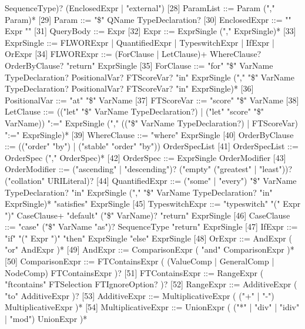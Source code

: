                           SequenceType)? (EnclosedExpr | "external")
[28]   	ParamList ::= Param ("," Param)*
[29]   	Param ::= "\$" QName TypeDeclaration?
[30]   	EnclosedExpr ::= "{" Expr "}"
[31]   	QueryBody ::= Expr
[32]   	Expr ::= ExprSingle ("," ExprSingle)*
[33]   	ExprSingle ::= FLWORExpr
                       | QuantifiedExpr
                       | TypeswitchExpr
                       | IfExpr
                       | OrExpr
[34]   	FLWORExpr ::= (ForClause | LetClause)+ WhereClause? OrderByClause?
                      "return" ExprSingle
[35]   	ForClause ::= "for" "\$" VarName TypeDeclaration? PositionalVar?
                      FTScoreVar? "in" ExprSingle ("," "\$" VarName
                      TypeDeclaration? PositionalVar?
                      FTScoreVar? "in" ExprSingle)* 
[36]   	PositionalVar ::= "at" "\$" VarName
[37]   	FTScoreVar ::= "score" "\$" VarName
[38]   	LetClause ::= (("let" "\$" VarName TypeDeclaration?) | ("let" "score"
                      "\$" VarName)) ":=" ExprSingle ("," (("\$" VarName
                      TypeDeclaration?) | FTScoreVar) ":=" ExprSingle)*
[39]   	WhereClause ::= "where" ExprSingle
[40]   	OrderByClause ::= (("order" "by") | ("stable" "order" "by"))
                          OrderSpecList 
[41]   	OrderSpecList ::= OrderSpec ("," OrderSpec)*
[42]   	OrderSpec ::= ExprSingle OrderModifier
[43]   	OrderModifier ::= ("ascending" | "descending")? ("empty" ("greatest"
                          | "least"))? ("collation" URILiteral)?
[44]   	QuantifiedExpr ::= ("some" | "every") "\$" VarName TypeDeclaration?
                           "in" ExprSingle ("," "\$" VarName TypeDeclaration?
                           "in" ExprSingle)* "satisfies" ExprSingle
[45]   	TypeswitchExpr ::= "typeswitch" "(" Expr ")" CaseClause+ "default"
                           ("\$" VarName)? "return" ExprSingle
[46]   	CaseClause ::= "case" ("\$" VarName "as")? SequenceType "return"
                       ExprSingle
[47]   	IfExpr ::= "if" "(" Expr ")" "then" ExprSingle "else" ExprSingle
[48]   	OrExpr ::= AndExpr ( "or" AndExpr )*
[49]   	AndExpr ::= ComparisonExpr ( "and" ComparisonExpr )*
[50]   	ComparisonExpr ::= FTContainsExpr ( (ValueComp
                           | GeneralComp
                           | NodeComp) FTContainsExpr )?
[51]   	FTContainsExpr ::= RangeExpr ( "ftcontains" FTSelection
                           FTIgnoreOption? )?
[52]   	RangeExpr ::= AdditiveExpr ( "to" AdditiveExpr )?
[53]   	AdditiveExpr ::= MultiplicativeExpr ( ("+" | "-") MultiplicativeExpr
)*
[54]   	MultiplicativeExpr	   ::=   	UnionExpr ( ("*" | "div" | "idiv" | "mod") UnionExpr )*
